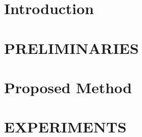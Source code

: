 \documentclass[10pt]{jarticle}
\begin{document}
\maketitle



\section{Introduction}\label{sec:Introduction}


\section{PRELIMINARIES}\label{sec:Preliminaries}


\section{Proposed Method}\label{sec:ProposedMethod}


\section{EXPERIMENTS}\label{sec:Experiments}


\begin{spacing}{0.9}
    
    \small
    \setlength{\itemsep}{0pt}
    
\end{spacing}

\end{document}
